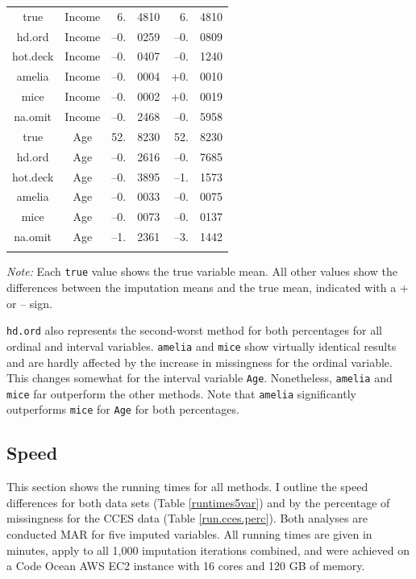 \documentclass[12pt,econ]{sources/authesis}
\begin{document}
\begin{table}[!htbp]
\begin{threeparttable}
\begin{tabular}{ccr@{}lr@{}l}
 true & Income & 6.&4810 & 6.&4810 \\
 hd.ord & Income & --0.&0259 & --0.&0809 \\
 hot.deck & Income & --0.&0407 & --0.&1240 \\
 amelia & Income & --0.&0004 & +0.&0010 \\
 mice & Income & --0.&0002 & +0.&0019 \\
 na.omit & Income & --0.&2468 & --0.&5958 \\
 true & Age & 52.&8230 & 52.&8230 \\ 
 hd.ord & Age & --0.&2616 & --0.&7685 \\
 hot.deck & Age & --0.&3895 & --1.&1573 \\ 
 amelia & Age & --0.&0033 & --0.&0075 \\
 mice & Age & --0.&0073 & --0.&0137 \\
 na.omit & Age & --1.&2361 & --3.&1442 \\
 \hline \\[-1.8ex]  
\end{tabular} 
\begin{tablenotes}
\footnotesize{\textit{Note:} Each \texttt{true} value shows the true variable mean. All other values show the differences between the imputation means and the true mean, indicated with a + or -- sign.}
\end{tablenotes}
\end{threeparttable}
\end{table}
\texttt{hd.ord} also represents the second-worst method for both percentages for all ordinal and interval variables.
\texttt{amelia} and \texttt{mice} show virtually identical results and are hardly affected by the increase in missingness for the ordinal variable. This changes somewhat for the interval variable \texttt{Age}. Nonetheless, \texttt{amelia} and \texttt{mice} far outperform the other methods. Note that \texttt{amelia} significantly outperforms \texttt{mice} for \texttt{Age} for both percentages.

\hypertarget{ordmiss-results-speed}{%
\subsection{Speed}\label{ordmiss-results-speed}}

This section shows the running times for all methods. I outline the speed differences for both data sets (Table \ref{runtimes5var}) and by the percentage of missingness for the CCES data (Table \ref{run.cces.perc}). Both analyses are conducted MAR for five imputed variables. All running times are given in minutes, apply to all 1,000 imputation iterations combined, and were achieved on a Code Ocean AWS EC2 instance with 16 cores and 120 GB of memory.
\end{document}
